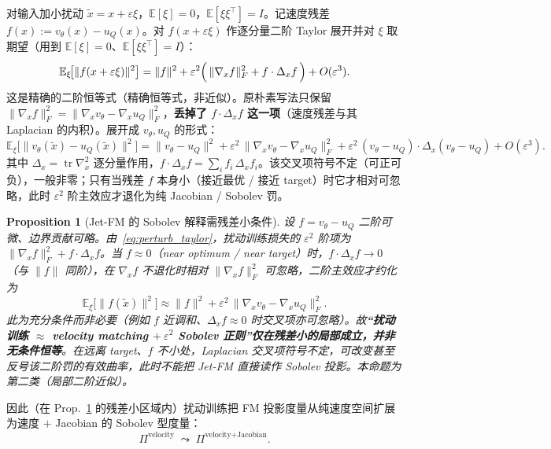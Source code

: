 \documentclass[11pt,a4paper]{article}
\newtheorem{proposition}[theorem]{Proposition}
\DeclareMathOperator{\tr}{tr}
\newcommand{\E}{\mathbb{E}}
\newcommand{\ProjectOp}{\Pi}
\begin{document}
对输入加小扰动 $\tilde{x} = x + \varepsilon\xi$，$\E[\xi]=0$，$\E[\xi\xi^\top]=I$。记速度残差 $f(x) := v_\theta(x) - u_Q(x)$。对 $f(x+\varepsilon\xi)$ 作逐分量二阶 Taylor 展开并对 $\xi$ 取期望（用到 $\E[\xi]=0$、$\E[\xi\xi^\top]=I$）：
\begin{equation}\label{eq:perturb_taylor}
\E_\xi\!\bigl[\|f(x+\varepsilon\xi)\|^2\bigr]
= \|f\|^2 + \varepsilon^2\Bigl(\,\|\nabla_x f\|_F^2 + f\cdot\Delta_x f\,\Bigr) + O(\varepsilon^3).
\end{equation}
这是精确的二阶恒等式（精确恒等式，非近似）。原朴素写法只保留 $\|\nabla_x f\|_F^2 = \|\nabla_x v_\theta - \nabla_x u_Q\|_F^2$，\textbf{丢掉了 $f\cdot\Delta_x f$ 这一项}（速度残差与其 Laplacian 的内积）。展开成 $v_\theta,u_Q$ 的形式：
\begin{equation}\label{eq:perturb_full}
\E_\xi\!\bigl[\|v_\theta(\tilde{x}) - u_Q(\tilde{x})\|^2\bigr]
= \|v_\theta - u_Q\|^2
+ \varepsilon^2\,\|\nabla_x v_\theta - \nabla_x u_Q\|_F^2
+ \varepsilon^2\,(v_\theta - u_Q)\cdot\Delta_x(v_\theta - u_Q)
+ O(\varepsilon^3).
\end{equation}
其中 $\Delta_x = \tr\nabla_x^2$ 逐分量作用，$f\cdot\Delta_x f = \sum_i f_i\,\Delta_x f_i$。该交叉项符号不定（可正可负），一般非零；只有当残差 $f$ 本身小（接近最优 / 接近 target）时它才相对可忽略，此时 $\varepsilon^2$ 阶主效应才退化为纯 Jacobian / Sobolev 罚。

\begin{proposition}[Jet-FM 的 Sobolev 解释需残差小条件]\label{prop:jetfm_sobolev}
设 $f = v_\theta - u_Q$ 二阶可微、边界贡献可略。由~\eqref{eq:perturb_taylor}，扰动训练损失的 $\varepsilon^2$ 阶项为 $\|\nabla_x f\|_F^2 + f\cdot\Delta_x f$。当 $f\approx 0$（near optimum / near target）时，$f\cdot\Delta_x f\to 0$（与 $\|f\|$ 同阶），在 $\nabla_x f$ 不退化时相对 $\|\nabla_x f\|_F^2$ 可忽略，二阶主效应才约化为
\[
\E_\xi\!\bigl[\|f(\tilde x)\|^2\bigr] \approx \|f\|^2 + \varepsilon^2\,\|\nabla_x v_\theta - \nabla_x u_Q\|_F^2 .
\]
此为充分条件而非必要（例如 $f$ 近调和、$\Delta_x f\approx 0$ 时交叉项亦可忽略）。故\textbf{“扰动训练 $\approx$ velocity matching $+\ \varepsilon^2$ Sobolev 正则”仅在残差小的局部成立，并非无条件恒等}。在远离 target、$f$ 不小处，Laplacian 交叉项符号不定，可改变甚至反号该二阶罚的有效曲率，此时不能把 Jet-FM 直接读作 Sobolev 投影。本命题为第二类（局部二阶近似）。
\end{proposition}

因此（在 Prop.~\ref{prop:jetfm_sobolev} 的残差小区域内）扰动训练把 FM 投影度量从纯速度空间扩展为速度 $+$ Jacobian 的 Sobolev 型度量：
\begin{equation}\label{eq:sobolev_projection}
\ProjectOp^{\text{velocity}} \;\leadsto\; \ProjectOp^{\text{velocity+Jacobian}}.
\end{equation}
\end{document}
